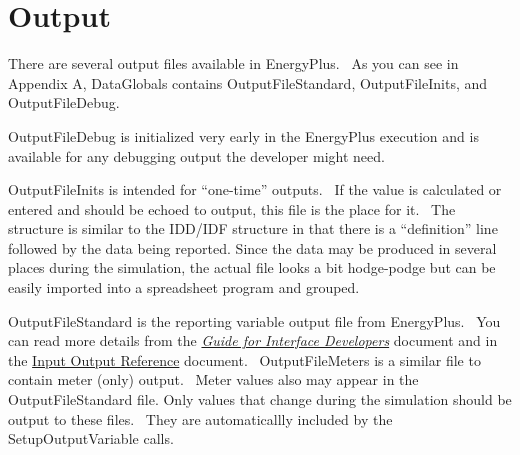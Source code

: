 \chapter{Output}\label{output}

There are several output files available in EnergyPlus.~ As you can see in Appendix A, DataGlobals contains OutputFileStandard, OutputFileInits, and OutputFileDebug.

OutputFileDebug is initialized very early in the EnergyPlus execution and is available for any debugging output the developer might need.

OutputFileInits is intended for ``one-time'' outputs.~ If the value is calculated or entered and should be echoed to output, this file is the place for it.~ The structure is similar to the IDD/IDF structure in that there is a ``definition'' line followed by the data being reported. Since the data may be produced in several places during the simulation, the actual file looks a bit hodge-podge but can be easily imported into a spreadsheet program and grouped.

OutputFileStandard is the reporting variable output file from EnergyPlus.~ You can read more details from the \href{file:///E:/Docs4PDFs/InterfaceDeveloper.pdf}{\emph{Guide for Interface Developers}} document and in the \href{file:///E:/Docs4PDFs/InputOutputReference.pdf}{Input Output Reference} document.~ OutputFileMeters is a similar file to contain meter (only) output.~ Meter values also may appear in the OutputFileStandard file. Only values that change during the simulation should be output to these files.~ They are automaticallly included by the SetupOutputVariable calls.
